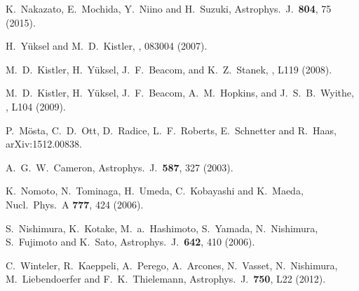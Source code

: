 \documentclass[aps,prd,nofootinbib,twocolumn,floatfix,letterpaper,superscriptaddress,showpacs]{revtex4}
\begin{document}
\begin{thebibliography}{99}
  K.~Nakazato, E.~Mochida, Y.~Niino and H.~Suzuki,
  Astrophys.\ J.\  {\bf 804}, 75 (2015).


  H.\ Y{\"u}ksel and M.~D.\ Kistler,
  , 083004 (2007).

  M.~D.\ Kistler, H.\ Y{\"u}ksel, J.~F.\ Beacom, and K.~Z.\ Stanek,
  , L119 (2008).

  M.~D.\ Kistler, H.\ Y{\"u}ksel, J.~F.\ Beacom, A.~M.\ Hopkins, and J.~S.~B.\ Wyithe,
  , L104 (2009).




  P.~M{\"o}sta, C.~D.~Ott, D.~Radice, L.~F.~Roberts, E.~Schnetter and R.~Haas,
  arXiv:1512.00838.



 A.~G.~W.\ Cameron,
 Astrophys.\ J.\  {\bf 587}, 327 (2003). 


  K.~Nomoto, N.~Tominaga, H.~Umeda, C.~Kobayashi and K.~Maeda,
  Nucl.\ Phys.\ A {\bf 777}, 424 (2006).

  S.~Nishimura, K.~Kotake, M.~a.~Hashimoto, S.~Yamada, N.~Nishimura, S.~Fujimoto and K.~Sato,
  Astrophys.\ J.\  {\bf 642}, 410 (2006).

  C.~Winteler, R.~Kaeppeli, A.~Perego, A.~Arcones, N.~Vasset, N.~Nishimura, M.~Liebendoerfer and F.~K.~Thielemann,
  Astrophys.\ J.\  {\bf 750}, L22 (2012).


\end{thebibliography}
\end{document}
